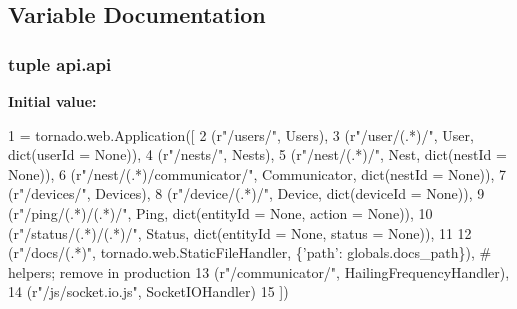 \subsection{Variable Documentation}
\hypertarget{namespaceapi_a5697ea202319f894facccacf78d93e89}{
\subsubsection[{api}]{\setlength{\rightskip}{0pt plus 5cm}tuple api.\-api}}\label{namespaceapi_a5697ea202319f894facccacf78d93e89}
{\bfseries Initial value\-:}
\begin{DoxyCode}
1 = tornado.web.Application([
2     (\textcolor{stringliteral}{r"/users/"}, Users),
3     (\textcolor{stringliteral}{r"/user/(.*)/"}, User, dict(userId = \textcolor{keywordtype}{None})),
4     (\textcolor{stringliteral}{r"/nests/"}, Nests),
5     (\textcolor{stringliteral}{r"/nest/(.*)/"}, Nest, dict(nestId = \textcolor{keywordtype}{None})),
6     (\textcolor{stringliteral}{r"/nest/(.*)/communicator/"}, Communicator, dict(nestId = \textcolor{keywordtype}{None})),
7     (\textcolor{stringliteral}{r"/devices/"}, Devices),
8     (\textcolor{stringliteral}{r"/device/(.*)/"}, Device, dict(deviceId = \textcolor{keywordtype}{None})),
9     (\textcolor{stringliteral}{r"/ping/(.*)/(.*)/"}, Ping, dict(entityId = \textcolor{keywordtype}{None}, action = \textcolor{keywordtype}{None})),
10     (\textcolor{stringliteral}{r"/status/(.*)/(.*)/"}, Status, dict(entityId = \textcolor{keywordtype}{None}, status = \textcolor{keywordtype}{None})),
11     
12     (\textcolor{stringliteral}{r"/docs/(.*)"}, tornado.web.StaticFileHandler, \{\textcolor{stringliteral}{'path'}: globals.docs\_path\}),    \textcolor{comment}{# helpers; remove in
       production}
13     (\textcolor{stringliteral}{r"/communicator/"}, HailingFrequencyHandler),
14     (\textcolor{stringliteral}{r"/js/socket.io.js"}, SocketIOHandler)
15 ])
\end{DoxyCode}
